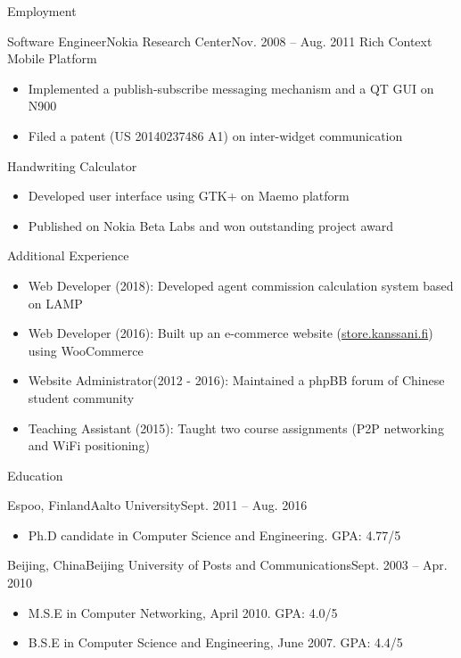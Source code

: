 \documentclass[print]{mcdowellcv}
\begin{document}
\begin{cvsection}{Employment}
		\begin{cvsubsection}{Software Engineer}{Nokia Research Center}{Nov. 2008 -- Aug. 2011}
			Rich Context Mobile Platform
			\begin{itemize}
				\item Implemented a publish-subscribe messaging mechanism and a QT GUI on N900
				\item Filed a patent (US 20140237486 A1) on inter-widget communication
			\end{itemize}
			\smallskip
			Handwriting Calculator
			\begin{itemize}
				\item Developed user interface using GTK+ on Maemo platform
				\item Published on Nokia Beta Labs and won outstanding project award
			\end{itemize}
		\end{cvsubsection}

	\end{cvsection}

	\begin{cvsection}{Additional Experience}
		\begin{cvsubsection}{}{}{}	
			\begin{itemize}
				\item Web Developer (2018): Developed agent commission calculation system based on LAMP
				\item Web Developer (2016): Built up an e-commerce website (\url{store.kanssani.fi}) using WooCommerce
				\item Website Administrator(2012 - 2016): Maintained a phpBB forum of Chinese student community
				\item Teaching Assistant (2015): Taught two course assignments (P2P networking and WiFi positioning)
			\end{itemize}
		\end{cvsubsection}
	\end{cvsection}
	
	\begin{cvsection}{Education}
		\begin{cvsubsection}{Espoo, Finland}{Aalto University}{Sept. 2011 -- Aug. 2016}
			\begin{itemize}
				\item Ph.D candidate in Computer Science and Engineering. GPA: 4.77/5
			\end{itemize}
		\end{cvsubsection}

		\begin{cvsubsection}[2]{Beijing, China}{Beijing University of Posts and Communications}{Sept. 2003 --  Apr. 2010}
			\begin{itemize}
				\item M.S.E in Computer Networking, April 2010. GPA: 4.0/5				 
				\item B.S.E in Computer Science and Engineering, June 2007. GPA: 4.4/5
			\end{itemize}
		\end{cvsubsection}
	\end{cvsection}
	
\end{document}
